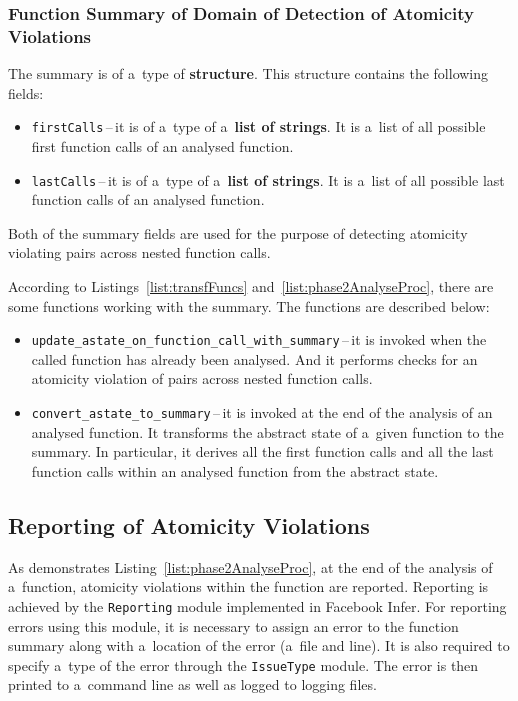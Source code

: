 \subsubsection{%
    Function Summary of Domain of Detection of Atomicity Violations
}

The summary is of a~type of \textbf{structure}. This structure contains
the following fields:
\begin{itemize}
    \item
        \texttt{firstCalls}\,--\,it is of a~type of a~\textbf{list of
        strings}. It is a~list of all possible first function calls
        of an analysed function.

    \item
        \texttt{lastCalls}\,--\,it is of a~type of a~\textbf{list of
        strings}. It is a~list of all possible last function calls
        of an analysed function.
\end{itemize}
Both of the summary fields are used for the purpose of detecting atomicity
violating pairs across nested function calls.

According to Listings~\ref{list:transfFuncs}
and~\ref{list:phase2AnalyseProc}, there are some functions working
with the summary. The functions are described below:
\begin{itemize}
    \item
        \texttt{update\_astate\_on\_function\_call\_with\_summary}\,--\,it is
        invoked when the called \linebreak function has already been analysed.
        And it performs checks for an atomicity violation of pairs across
        nested function calls.

    \item
        \texttt{convert\_astate\_to\_summary}\,--\,it is invoked at the end
        of the analysis of an analysed function. It transforms the abstract
        state of a~given function to the summary. In particular, it derives
        all the first function calls and all the last function calls within
        an analysed function from the abstract state.
\end{itemize}


\subsection{Reporting of Atomicity Violations}
\label{sec:implementPhase2Report}

As demonstrates Listing~\ref{list:phase2AnalyseProc}, at the
end of the analysis of a~function, atomicity violations within
the function are reported. Reporting is achieved by the \texttt{Reporting}
module implemented in Facebook Infer. For reporting errors using
this module, it is necessary to assign an error to the function
summary along with a~location of the error (a~file and line). It is
also required to specify a~type of the error through the
\texttt{IssueType} module. The error is then printed to a~command line
as well as logged to logging files.

